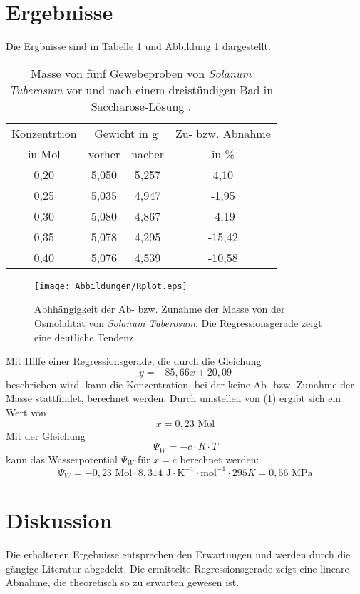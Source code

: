 \documentclass[11pt,a4paper,DIV=10,]{scrartcl}
\begin{document}
\section*{Ergebnisse}
Die Ergbnisse sind in Tabelle 1 und Abbildung 1 dargestellt.
\begin{table}[H]
\caption{Masse von fünf Gewebeproben von \textit{Solanum Tuberosum} vor und nach einem dreistündigen Bad in Saccharose-Lösung .}
\label{tab1}
\center
\begin{tabular}{cccc}
\toprule
Konzentrtion &\multicolumn{2}{c}{Gewicht in g} & Zu- bzw. Abnahme \\
in Mol &vorher & nacher & in \%\\
\midrule
0,20 & 5,050 & 5,257 & 4,10 \\
0,25 & 5,035 & 4,947 & -1,95\\
0,30 & 5,080 & 4,867 & -4,19\\
0,35 & 5,078 & 4,295 & -15,42\\
0,40 & 5,076 & 4,539 & -10,58\\
\bottomrule
\end{tabular}
\end{table}
\begin{figure}[H]
\center
\captionsetup{width=1\textwidth}	
\texttt{[image: Abbildungen/Rplot.eps]}
\caption{Abhhängigkeit der Ab- bzw. Zunahme der Masse von der Osmolalität von \textit{Solanum Tuberosum}. Die Regressionsgerade zeigt eine deutliche Tendenz.}
\label{v1}
\end{figure}
\noindent
Mit Hilfe einer Regressionsgerade, die durch die Gleichung
\begin{equation}
y= -85,66x+20,09
\end{equation}
beschrieben wird, kann die Konzentration, bei der keine Ab- bzw. Zunahme der Masse stattfindet, berechnet werden. Durch umstellen von (1) ergibt sich ein Wert von
\begin{equation}
x=0,23 \textrm{~Mol}
\end{equation}
Mit der Gleichung
\begin{equation}
\Psi_W=-c\cdot R\cdot T
\end{equation}
kann das Wasserpotential $\Psi_W$ für $x=c$ berechnet werden:
\begin{equation}
\Psi_W=-0,23 \textrm{~Mol} \cdot 8,314 \textrm{~J}\cdot\textrm{K}^{-1}\cdot \textrm{mol}^{-1}\cdot 295 K=0,56 \textrm{~MPa}
 \end{equation}
\section*{Diskussion}
Die erhaltenen Ergebnisse entsprechen den Erwartungen und werden durch die gängige Literatur abgedekt. Die ermittelte Regressionsgerade zeigt eine lineare Abnahme, die theoretisch so zu erwarten gewesen ist. 
\end{document}

